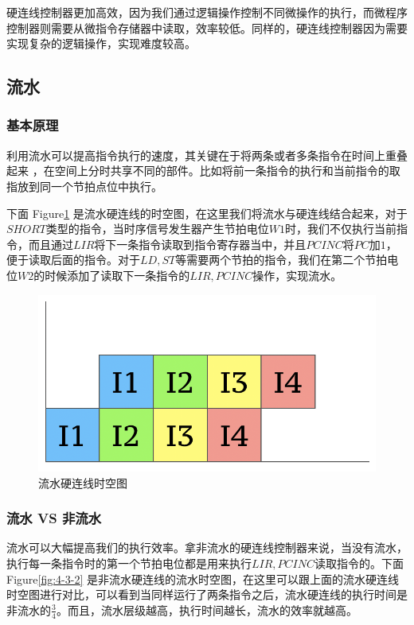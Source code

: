 \documentclass[12pt]{article}
\begin{document}
{            硬连线控制器更加高效，因为我们通过逻辑操作控制不同微操作的执行，而微程序控制器则需要从微指令存储器中读取，效率较低。同样的，硬连线控制器因为需要实现复杂的逻辑操作，实现难度较高。
            
    \subsection{流水}
        \subsubsection{基本原理}
            利用流水可以提高指令执行的速度，其关键在于将两条或者多条指令在时间上重叠起来
            ，在空间上分时共享不同的部件。比如将前一条指令的执行和当前指令的取指放到同一个节拍点位中执行。
            
            下面 Figure\ref{fig:4-3-1} 是流水硬连线的时空图，在这里我们将流水与硬连线结合起来，对于$SHORT$类型的指令，当时序信号发生器产生节拍电位$W1$时，我们不仅执行当前指令，而且通过$LIR$将下一条指令读取到指令寄存器当中，并且$PCINC$将$PC$加$1$，便于读取后面的指令。对于$LD, ST$等需要两个节拍的指令，我们在第二个节拍电位$W2$的时候添加了读取下一条指令的$LIR, PCINC$操作，实现流水。
            
            \begin{figure}
                \centering
                \includegraphics[width=1.0\textwidth]{流水.png}
                \caption{流水硬连线时空图}
                \label{fig:4-3-1}
            \end{figure}
            
        \subsubsection{流水 VS 非流水}
            流水可以大幅提高我们的执行效率。拿非流水的硬连线控制器来说，当没有流水，执行每一条指令时的第一个节拍电位都是用来执行$LIR, PCINC$读取指令的。下面 Figure\ref{fig:4-3-2} 是非流水硬连线的流水时空图，在这里可以跟上面的流水硬连线时空图进行对比，可以看到当同样运行了两条指令之后，流水硬连线的执行时间是非流水的$\frac{3}{4}$。而且，流水层级越高，执行时间越长，流水的效率就越高。
            
}
\end{document}
